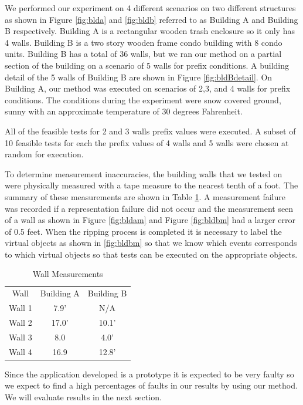 \documentclass[final,3p]{CSP}
\begin{document}
We performed our experiment on 4 different scenarios on two different structures as shown in Figure \ref{fig:blda} and \ref{fig:bldb} referred to as Building A and Building B respectively.  Building A is a rectangular wooden trash enclosure so it only has 4 walls.  Building B is a two story wooden frame condo building with 8 condo units.  Building B has a total of 36 walls, but we ran our method on a partial section of the building on a scenario of 5 walls for prefix conditions. A building detail of the 5 walls of Building B are shown in Figure \ref{fig:bldBdetail}.  On Building A, our method was executed on scenarios of 2,3, and 4 walls for prefix conditions.  The conditions during the experiment were snow covered ground, sunny with an approximate temperature of 30 degrees Fahrenheit.

All of the feasible tests for 2 and 3 walls prefix values were executed.  A subset of 10 feasible tests for each the prefix values of 4 walls and 5 walls were chosen at random for execution.

To determine measurement inaccuracies, the building walls that we tested on were physically measured with a tape measure to the nearest tenth of a foot.  The summary of these measurements are shown in Table \ref{tab:meas}.  A measurement failure was recorded if a representation failure did not occur and the measurement seen of a wall as shown in Figure \ref{fig:bldam} and Figure \ref{fig:bldbm} had a larger error of 0.5 feet.  When the ripping process is completed it is necessary to label the virtual objects as shown in \ref{fig:bldbm} so that we know which events corresponds to which virtual objects so that tests can be executed on the appropriate objects.

\begin{table}[]
    \centering
    \begin{tabular}{c|c|c}
         Wall & Building A & Building B  \\
         Wall 1 & 7.9' & N/A \\
         Wall 2 & 17.0' & 10.1' \\
         Wall 3 & 8.0 & 4.0' \\
         Wall 4 & 16.9 & 12.8' \\ 
    \end{tabular}
    \caption{Wall Measurements}
    \label{tab:meas}
\end{table}

Since the application developed is a prototype it is expected to be very faulty so we expect to find a high percentages of faults in our results by using our method.  We will evaluate results in the next section.
\end{document}

